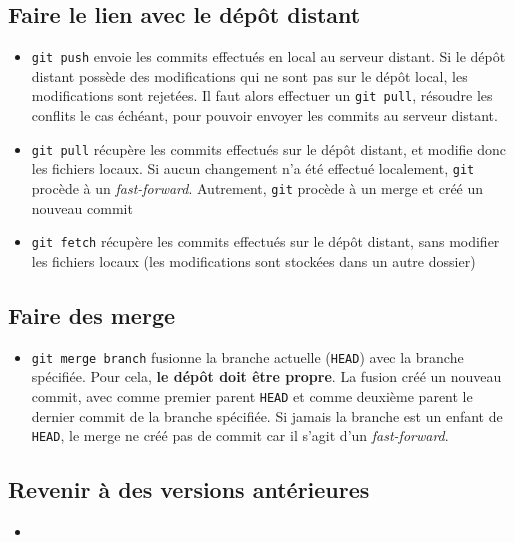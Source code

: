 \documentclass[french]{report}
\newcommand\itemb{\item[$\bullet$]}
\begin{document}
\subsection{Faire le lien avec le dépôt distant}

\begin{itemize}
    \itemb \texttt{git push} envoie les commits effectués en local au serveur distant.
    Si le dépôt distant possède des modifications qui ne sont pas sur le dépôt local, les modifications sont rejetées.
    Il faut alors effectuer un \texttt{git pull}, résoudre les conflits le cas échéant, pour pouvoir envoyer les commits au serveur distant.
    \itemb \texttt{git pull} récupère les commits effectués sur le dépôt distant, et modifie donc les fichiers locaux.
    Si aucun changement n'a été effectué localement, \texttt{git} procède à un \textit{fast-forward}.
    Autrement, \texttt{git} procède à un merge et créé un nouveau commit
    \itemb \texttt{git fetch} récupère les commits effectués sur le dépôt distant, sans modifier les fichiers locaux (les modifications sont stockées dans un autre dossier)
\end{itemize}

\subsection{Faire des merge}

\begin{itemize}
    \itemb \texttt{git merge branch} fusionne la branche actuelle (\texttt{HEAD}) avec la branche spécifiée.
    Pour cela, \textbf{le dépôt doit être propre}.
    La fusion créé un nouveau commit, avec comme premier parent \texttt{HEAD} et comme deuxième parent le dernier commit de la branche spécifiée.
    Si jamais la branche est un enfant de \texttt{HEAD}, le merge ne créé pas de commit car il s'agit d'un \textit{fast-forward}.
\end{itemize}


\subsection{Revenir à des versions antérieures}

\begin{itemize}
    \itemb 
\end{itemize}
\end{document}
